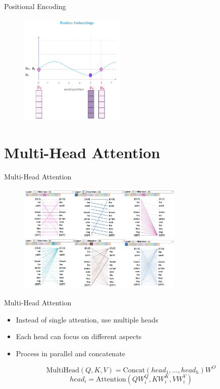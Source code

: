 \documentclass[serif, aspectratio=169]{beamer}
\begin{document}
\begin{frame}{Positional Encoding}

    \begin{figure}
        \centering
        \includegraphics[width=0.45\textwidth]{pic/positional-encoding-1.png}
        \label{fig:positional-encoding-1}
    \end{figure}
\end{frame}

\section{Multi-Head Attention}

\begin{frame}{Multi-Head Attention}

    \begin{figure}
        \centering
        \includegraphics[width=0.7\textwidth]{pic/multihead-attention-1.png}
        \label{fig:multihead_attention-1}
    \end{figure}
\end{frame}

\begin{frame}{Multi-Head Attention}
    \begin{itemize}
        \item Instead of single attention, use multiple heads
        \item Each head can focus on different aspects
        \item Process in parallel and concatenate
    \end{itemize}
    \begin{equation*}
        \text{MultiHead}(Q,K,V) = \text{Concat}(head_1,\ldots,head_h)W^O
    \end{equation*}
    \begin{equation*}
        head_i = \text{Attention}(QW^Q_i,KW^K_i,VW^V_i)
    \end{equation*}
\end{frame}
\end{document}
